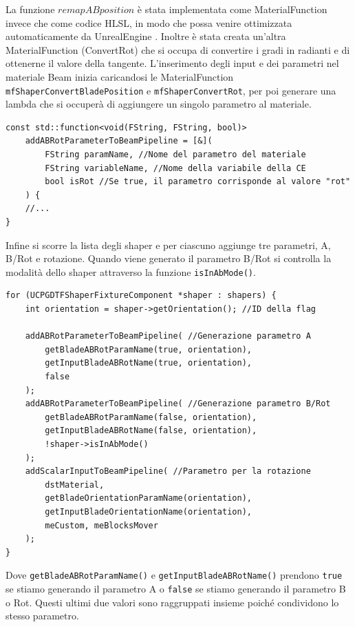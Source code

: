 \documentclass[main.tex]{subfiles}
\begin{document}
La funzione $remapABposition$ è stata implementata come MaterialFunction invece che come codice HLSL, in modo che possa venire ottimizzata automaticamente da UnrealEngine \cite{hlslNoOptimize}. Inoltre è stata creata un'altra MaterialFunction (ConvertRot) che si occupa di convertire i gradi in radianti e di ottenerne il valore della tangente. L'inserimento degli input e dei parametri nel materiale Beam inizia caricandosi le MaterialFunction \lstinline{mfShaperConvertBladePosition} e \lstinline{mfShaperConvertRot}, per poi generare una lambda che si occuperà di aggiungere un singolo parametro al materiale.
\begin{lstlisting}
const std::function<void(FString, FString, bool)>
    addABRotParameterToBeamPipeline = [&](
        FString paramName, //Nome del parametro del materiale
        FString variableName, //Nome della variabile della CE
        bool isRot //Se true, il parametro corrisponde al valore "rot"
    ) {
    //...
}
\end{lstlisting}
Infine si scorre la lista degli shaper e per ciascuno aggiunge tre parametri, A, B/Rot e rotazione. Quando viene generato il parametro B/Rot si controlla la modalità dello shaper attraverso la funzione \lstinline{isInAbMode()}.
\begin{lstlisting}
for (UCPGDTFShaperFixtureComponent *shaper : shapers) {
    int orientation = shaper->getOrientation(); //ID della flag

    addABRotParameterToBeamPipeline( //Generazione parametro A
        getBladeABRotParamName(true, orientation),
        getInputBladeABRotName(true, orientation),
        false
    );
    addABRotParameterToBeamPipeline( //Generazione parametro B/Rot
        getBladeABRotParamName(false, orientation),
        getInputBladeABRotName(false, orientation),
        !shaper->isInAbMode()
    );
    addScalarInputToBeamPipeline( //Parametro per la rotazione
        dstMaterial,
        getBladeOrientationParamName(orientation),
        getInputBladeOrientationName(orientation),
        meCustom, meBlocksMover
    );
}
\end{lstlisting}
Dove \lstinline{getBladeABRotParamName()} e \lstinline{getInputBladeABRotName()} prendono \lstinline{true} se stiamo generando il parametro A o \lstinline{false} se stiamo generando il parametro B o Rot. Questi ultimi due valori sono raggruppati insieme poiché condividono lo stesso parametro. \newline
\end{document}
